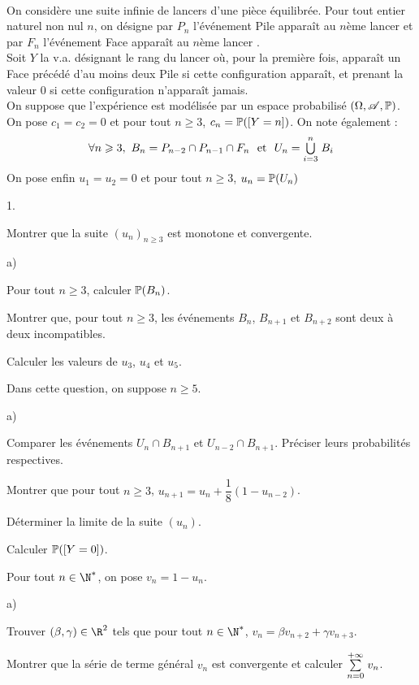 \documentclass[11pt]{article}%
\begin{document}
\begin{exercice}~\\
On considère une suite infinie de lancers d'une pièce équilibrée. Pour 
tout entier naturel non nul $n$, on désigne par $P_n$ l'événement \og 
Pile apparaît au $n$ème lancer \fg{} et par $F_n$ l'événement \og Face 
apparaît au $n$ème lancer \fg{}.\\
Soit $Y$ la v.a. désignant le rang du lancer où, pour la première fois, 
apparaît un Face précédé d'au moins deux Pile si cette configuration 
apparaît, et prenant la valeur $0$ si cette configuration n'apparaît 
jamais.\\
On suppose que l'expérience est modélisée par un espace probabilisé 
$(\Omega, \mathscr{A},\mathbb{P})$.\\
On pose $c_1=c_2=0$ et pour tout $n\geq 3$, $c_n=\mathbb{P}(\left[ {Y=n} \right])$. On 
note également :
\[
\forall n \geq 3, \ B_n=P_{n-2}\cap P_{n-1}\cap F_n \ \mbox{ et } \ 
U_n=\dcup{i=3}{n} B_i
\]
On pose enfin $u_1=u_2=0$ et pour tout $n\geq 3$, $u_n=\mathbb{P}(U_n)$
\begin{noliste}{1.}
\item Montrer que la suite $(u_n)_{n\geq 3}$ est monotone et 
convergente.
\item \begin{noliste}{a)}
	\item Pour tout $n\geq 3$, calculer $\mathbb{P}(B_n)$.
	\item Montrer que, pour tout $n\geq 3$, les événements $B_n$, 
$B_{n+1}$ et $B_{n+2}$ sont deux à deux incompatibles.
	\item Calculer les valeurs de $u_3$, $u_4$ et $u_5$.
	\end{noliste}
\item Dans cette question, on suppose $n\geq 5$.
	\begin{noliste}{a)}
	\item Comparer les événements $U_n \cap B_{n+1}$ et $U_{n-2} 
\cap B_{n+1}$. Préciser leurs probabilités respectives.
	\item Montrer que pour tout $n\geq 3$, $u_{n+1} 
=u_n+\dfrac{1}{8}(1-u_{n-2})$.
	\item Déterminer la limite de la suite $(u_n)$.
	\item Calculer $\mathbb{P}(\left[ {Y=0} \right])$.
	\end{noliste}
\item Pour tout $n\in \N^*$, on pose $v_n=1-u_n$.
\begin{noliste}{a)}
\item Trouver $(\beta,\gamma)\in\R^2$ tels que pour tout $n\in\N^*$, 
$v_n=\beta v_{n+2} +\gamma v_{n+3}$.
\item Montrer que la série de terme général $v_n$ est convergente et 
calculer ${\textstyle\sum\limits_{n=0}^{+\infty}}\hspace{.1cm} v_n$.
\end{noliste}
\end{noliste}
\end{exercice}
\end{document}
